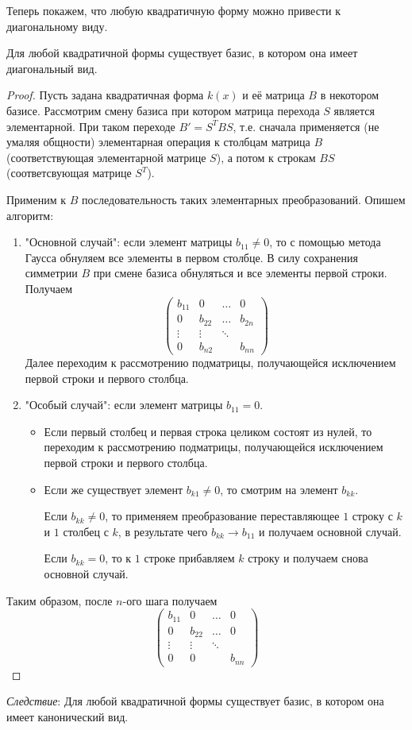 Теперь покажем, что любую квадратичную форму можно привести к диагональному виду.
\begin{theorem}
    Для любой квадратичной формы существует базис, в котором она имеет диагональный вид.
\end{theorem}
\begin{proof}
    Пусть задана квадратичная форма $k(x)$ и её матрица $B$ в некотором базисе. Рассмотрим смену базиса при котором матрица перехода $S$ является элементарной. При таком переходе $B'=S^TBS$, т.е. сначала применяется (не умаляя общности) элементарная операция к столбцам матрица $B$ (соответствующая элементарной матрице  $S$), а потом к строкам $BS$ (соответсвующая матрице $S^T$).

    Применим к $B$ последовательность таких элементарных преобразований. Опишем алгоритм:
    \begin{enumerate}
        \item "Основной случай": если элемент матрицы $b_{11}\neq 0$, то с помощью метода Гаусса обнуляем все элементы в первом столбце. В силу сохранения симметрии $B$ при смене базиса обнуляться и все элементы первой строки. Получаем
        \[
        \begin{pmatrix}
            b_{11}&0&\dots&0\\
            0 &b_{22} &\dots &b_{2n}\\
            \vdots &\vdots & \ddots&\\
            0&b_{n2}&&b_{nn}
        \end{pmatrix}
        \]
        Далее переходим к рассмотрению подматрицы, получающейся исключением первой строки и первого столбца.
        \item "Особый случай": если элемент матрицы $b_{11}= 0$.
            \begin{itemize}
                \item Если первый столбец и первая строка целиком состоят из нулей, то переходим к рассмотрению подматрицы, получающейся исключением первой строки и первого столбца.
                \item Если же существует элемент $b_{k1}\neq 0$, то смотрим на элемент $b_{kk}$. 
                
                Если $b_{kk}\neq0$, то применяем преобразование переставляющее $1$ строку с $k$ и $1$ столбец с $k$, в результате чего $b_{kk}\to b_{11}$ и получаем основной случай.
                
                Если $b_{kk}=0$, то к $1$ строке прибавляем $k$ строку и получаем снова основной случай.
            \end{itemize}
    \end{enumerate}
    Таким образом, после $n$-ого шага получаем \[
    \begin{pmatrix}
            b_{11}&0&\dots&0\\
            0 &b_{22} &\dots &0\\
            \vdots &\vdots & \ddots&\\
            0&0&&b_{nn}
        \end{pmatrix}
    \]
\end{proof}
\textit{Следствие}: Для любой квадратичной формы существует базис, в котором она имеет канонический вид.

